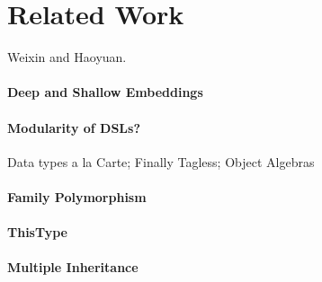 \section{Related Work}

Weixin and Haoyuan.

\paragraph{Deep and Shallow Embeddings}

\paragraph{Modularity of DSLs?}
Data types a la Carte; Finally Tagless; 
Object Algebras

\paragraph{Family Polymorphism}

\paragraph{ThisType}

\paragraph{Multiple Inheritance}
